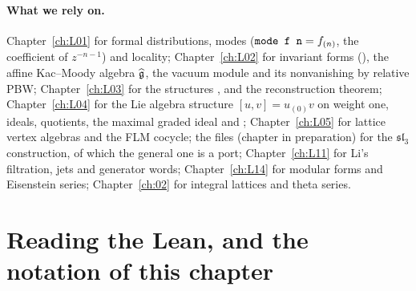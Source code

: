 \paragraph{What we rely on.}
Chapter~\ref{ch:L01} for formal distributions, modes ($\lean{mode f n}=f_{(n)}$, the coefficient of
$z^{-n-1}$) and locality; Chapter~\ref{ch:L02} for invariant forms (), the affine Kac--Moody
algebra $\widehat{\mathfrak g}$, the vacuum module  and its nonvanishing by relative PBW;
Chapter~\ref{ch:L03} for the structures ,  and the
reconstruction theorem; Chapter~\ref{ch:L04} for the Lie algebra structure $[u,v]=u_{(0)}v$ on weight one, ideals,
quotients, the maximal graded ideal and ; Chapter~\ref{ch:L05} for lattice vertex algebras
 and the FLM cocycle; the files  (chapter in preparation) for the $\mathfrak{sl}_3$ construction, of which the
general one is a port; Chapter~\ref{ch:L11} for Li's filtration, jets and generator words; Chapter~\ref{ch:L14} for
modular forms and Eisenstein series; Chapter~\ref{ch:02} for integral lattices and theta series.

\section{Reading the Lean, and the notation of this chapter}\label{l23:sec:readlean}

